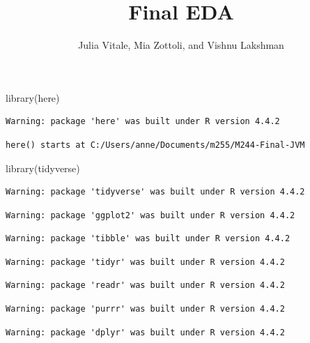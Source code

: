 \documentclass[
  letterpaper,
  DIV=11,
  numbers=noendperiod]{scrartcl}
\title{Final EDA}
\author{Julia Vitale, Mia Zottoli, and Vishnu Lakshman}
\date{}
\newenvironment{Shaded}{\begin{snugshade}}{\end{snugshade}}
\newcommand{\FunctionTok}[1]{\textcolor[rgb]{0.28,0.35,0.67}{#1}}
\newcommand{\NormalTok}[1]{\textcolor[rgb]{0.00,0.23,0.31}{#1}}
\begin{document}
\maketitle


\begin{Shaded}
\begin{Highlighting}[]
\FunctionTok{library}\NormalTok{(here)}
\end{Highlighting}
\end{Shaded}

\begin{verbatim}
Warning: package 'here' was built under R version 4.4.2
\end{verbatim}

\begin{verbatim}
here() starts at C:/Users/anne/Documents/m255/M244-Final-JVM
\end{verbatim}

\begin{Shaded}
\begin{Highlighting}[]
\FunctionTok{library}\NormalTok{(tidyverse)}
\end{Highlighting}
\end{Shaded}

\begin{verbatim}
Warning: package 'tidyverse' was built under R version 4.4.2
\end{verbatim}

\begin{verbatim}
Warning: package 'ggplot2' was built under R version 4.4.2
\end{verbatim}

\begin{verbatim}
Warning: package 'tibble' was built under R version 4.4.2
\end{verbatim}

\begin{verbatim}
Warning: package 'tidyr' was built under R version 4.4.2
\end{verbatim}

\begin{verbatim}
Warning: package 'readr' was built under R version 4.4.2
\end{verbatim}

\begin{verbatim}
Warning: package 'purrr' was built under R version 4.4.2
\end{verbatim}

\begin{verbatim}
Warning: package 'dplyr' was built under R version 4.4.2
\end{verbatim}
\end{document}
